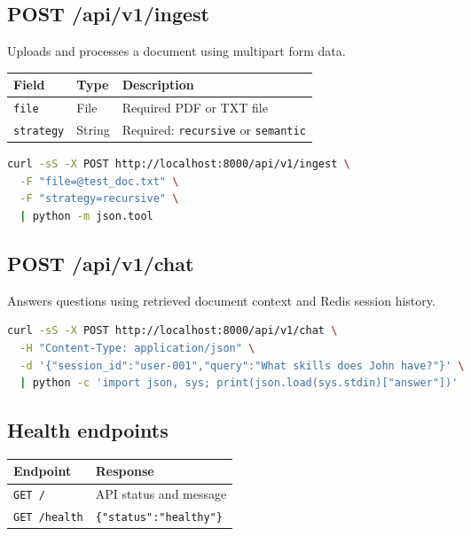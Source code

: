 \documentclass[12pt, a4paper]{article}
\begin{document}
\subsection{POST /api/v1/ingest}

Uploads and processes a document using multipart form data.

\begin{tabularx}{\textwidth}{L{2.5cm} L{2.5cm} Y}
    \toprule
    \textbf{Field} & \textbf{Type} & \textbf{Description} \\
    \midrule
    \texttt{file} & File & Required PDF or TXT file \\
    \texttt{strategy} & String & Required: \texttt{recursive} or
    \texttt{semantic} \\
    \bottomrule
\end{tabularx}

\begin{lstlisting}[language=bash]
curl -sS -X POST http://localhost:8000/api/v1/ingest \
  -F "file=@test_doc.txt" \
  -F "strategy=recursive" \
  | python -m json.tool
\end{lstlisting}

\subsection{POST /api/v1/chat}

Answers questions using retrieved document context and Redis session history.

\begin{lstlisting}[language=bash]
curl -sS -X POST http://localhost:8000/api/v1/chat \
  -H "Content-Type: application/json" \
  -d '{"session_id":"user-001","query":"What skills does John have?"}' \
  | python -c 'import json, sys; print(json.load(sys.stdin)["answer"])'
\end{lstlisting}

\subsection{Health endpoints}

\begin{tabularx}{\textwidth}{L{3.5cm} Y}
    \toprule
    \textbf{Endpoint} & \textbf{Response} \\
    \midrule
    \texttt{GET /} & API status and message \\
    \texttt{GET /health} & \texttt{\{"status":"healthy"\}} \\
    \bottomrule
\end{tabularx}
\end{document}
